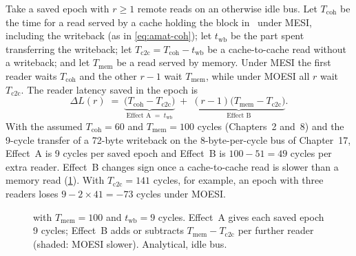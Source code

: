 Take a saved epoch with $r\ge1$ remote reads on an otherwise idle bus. Let
$T_{\mathrm{coh}}$ be the time for a read served by a cache holding the block in
\stM\ under MESI, including the writeback (as in \cref{eq:amat-coh}); let
$t_{\mathrm{wb}}$ be the part spent transferring the writeback; let
$T_{\mathrm{c2c}} = T_{\mathrm{coh}} - t_{\mathrm{wb}}$ be a cache-to-cache read
without a writeback; and let $T_{\mathrm{mem}}$ be a read served by memory. Under
MESI the first reader waits $T_{\mathrm{coh}}$ and the other $r-1$ wait
$T_{\mathrm{mem}}$, while under MOESI all $r$ wait $T_{\mathrm{c2c}}$. The reader
latency saved in the epoch is
\begin{equation}
  \Delta L(r) \;=\; \underbrace{\bigl(T_{\mathrm{coh}} - T_{\mathrm{c2c}}\bigr)}_{\text{Effect A}\;=\;t_{\mathrm{wb}}}
  \;+\; \underbrace{(r-1)\bigl(T_{\mathrm{mem}} - T_{\mathrm{c2c}}\bigr)}_{\text{Effect B}} .
  \label{eq:dL}
\end{equation}
With the assumed $T_{\mathrm{coh}}=60$ and $T_{\mathrm{mem}}=100$ cycles (Chapters~2
and~8) and the 9-cycle transfer of a 72-byte writeback on the 8-byte-per-cycle bus
of Chapter~17, Effect~A is 9 cycles per saved epoch and Effect~B is $100-51 = 49$
cycles per extra reader. Effect~B changes sign once a cache-to-cache read is slower
than a memory read (\cref{fig:dL}). With $T_{\mathrm{c2c}}=141$ cycles, for
example, an epoch with three readers loses $9-2\times41 = -73$ cycles under MOESI.

\begin{figure}[htbp]
\centering
{}
\caption[Latency saved per epoch]{ with $T_{\mathrm{mem}}=100$ and
$t_{\mathrm{wb}}=9$ cycles. Effect~A gives each saved epoch 9 cycles; Effect~B adds
or subtracts $T_{\mathrm{mem}}-T_{\mathrm{c2c}}$ per further reader (shaded: MOESI
slower). Analytical, idle bus.}
\label{fig:dL}
\end{figure}

